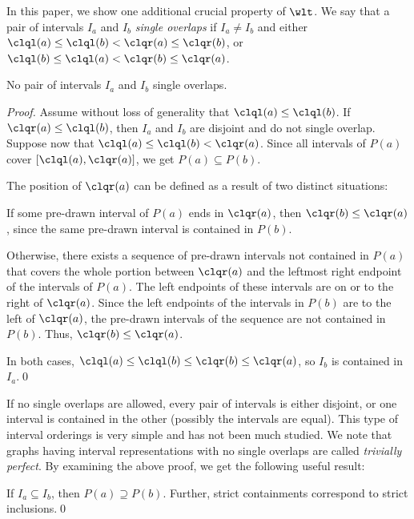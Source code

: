 In this paper, we show one additional crucial property of $\wlt$. We say that a pair of intervals
$I_a$ and $I_b$ \emph{single overlaps} if $I_a \ne I_b$ and either $\clql(a) \le \clql(b) < \clqr(a)
\le \clqr(b)$, or $\clql(b) \le \clql(a) < \clqr(b)
\le \clqr(a)$.

\begin{lemma} \label{lem:single_overlap}
No pair of intervals $I_a$ and $I_b$ single overlaps.
\end{lemma}

\begin{proof}
Assume without loss of generality that $\clql(a) \le \clql(b)$. If $\clqr(a) \le \clql(b)$, then
$I_a$ and $I_b$ are disjoint and do not single overlap. Suppose now that $\clql(a) \le \clql(b) <
\clqr(a)$. Since all intervals of $P(a)$ cover $[\clql(a),\clqr(a)]$, we get $P(a) \subseteq P(b)$.

The position of $\clqr(a)$ can be defined as a result of two distinct situations:
\begin{packed_itemize}
\item If some pre-drawn interval of $P(a)$ ends in $\clqr(a)$, then $\clqr(b) \le \clqr(a)$, since
the same pre-drawn interval is contained in $P(b)$. 
\item Otherwise, there exists a sequence of pre-drawn intervals not contained in $P(a)$ that covers
the whole portion between $\clqr(a)$ and the leftmost right endpoint of the intervals of $P(a)$.
The left endpoints of these intervals are on or to the right of $\clqr(a)$. Since the left endpoints
of the intervals in $P(b)$ are to the left of $\clqr(a)$, the pre-drawn intervals of the sequence
are not contained in $P(b)$. Thus, $\clqr(b) \le \clqr(a)$.
\end{packed_itemize}
In both cases, $\clql(a) \le \clql(b) \le \clqr(b) \le \clqr(a)$, so $I_b$ is contained in $I_a$.\qed
\end{proof}

If no single overlaps are allowed, every pair of intervals is either disjoint, or one interval is
contained in the other (possibly the intervals are equal). This type of interval orderings is very
simple and has not been much studied. We note that graphs having interval representations with no single
overlaps are called \emph{trivially perfect}. By examining the above proof, we get the following
useful result:

\begin{lemma} \label{lem:open_intervals}
If $I_a \subseteq I_b$, then $P(a) \supseteq P(b)$. Further, strict containments correspond
to strict inclusions.\qed
\end{lemma}

